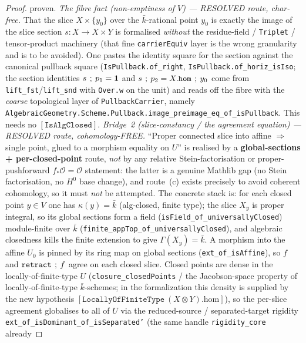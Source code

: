 \begin{proof}
  proven.
  \emph{The fibre fact (non-emptiness of \(V\)) --- RESOLVED route, char-free.} That the slice
  \(X \times \{y_0\}\) over the \(\bar k\)-rational point \(y_0\) is exactly the image of the slice
  section \(s \colon X \to X \times Y\) is formalised \emph{without} the residue-field /
  \texttt{Triplet} / tensor-product machinery (that fine \texttt{carrierEquiv} layer is the wrong
  granularity and is to be avoided). One pastes the identity square for the section against the
  canonical pullback square (\texttt{IsPullback.of\_right},
  \texttt{IsPullback.of\_horiz\_isIso}; the section identities \(s \fatsemi p_1 = \mathbf 1\) and
  \(s \fatsemi p_2 = X.\mathtt{hom} \fatsemi y_0\) come from \texttt{lift\_fst}/\texttt{lift\_snd}
  with \texttt{Over.w} on the unit) and reads off the fibre with the \emph{coarse} topological
  layer of \texttt{PullbackCarrier}, namely
  \texttt{AlgebraicGeometry.Scheme.Pullback.image\_preimage\_eq\_of\_isPullback}. This needs no
  \([\mathtt{IsAlgClosed}]\).
  \emph{Bridge~2 (slice-constancy / the agreement equation) --- RESOLVED route, cohomology-FREE.}
  ``Proper connected slice into affine \(\Rightarrow\) single point, glued to a morphism equality on
  \(U\)'' is realised by a \textbf{global-sections + per-closed-point} route, \emph{not} by any
  relative Stein-factorisation or proper-pushforward \(f_*\mathcal O = \mathcal O\) statement: the
  latter is a genuine Mathlib gap (no Stein factorisation, no \(H^0\) base change), and route~(c)
  exists precisely to avoid coherent cohomology, so it must \emph{not} be attempted. The concrete
  stack is: for each closed point \(y \in V\) one has \(\kappa(y) = \bar k\) (alg-closed, finite type);
  the slice \(X_y\) is proper integral, so its global sections form a field
  (\texttt{isField\_of\_universallyClosed}) module-finite over \(\bar k\)
  (\texttt{finite\_appTop\_of\_universallyClosed}), and algebraic closedness kills the finite
  extension to give \(\Gamma(X_y) = \bar k\). A morphism into the affine \(U_0\) is pinned by its ring
  map on global sections (\texttt{ext\_of\_isAffine}), so \(f\) and
  \(\mathtt{retract} \fatsemi f\) agree on each closed slice. Closed points are dense in the
  locally-of-finite-type \(U\) (\texttt{closure\_closedPoints} / the Jacobson-space property of
  locally-of-finite-type \(\bar k\)-schemes; in the formalization this density is supplied by the new
  hypothesis \([\mathtt{LocallyOfFiniteType}\ (X \otimes Y).\mathrm{hom}]\)), so the per-slice
  agreement globalises to all of \(U\) via the reduced-source / separated-target rigidity
  \texttt{ext\_of\_isDominant\_of\_isSeparated'} (the same handle \texttt{rigidity\_core} already

\end{proof}
